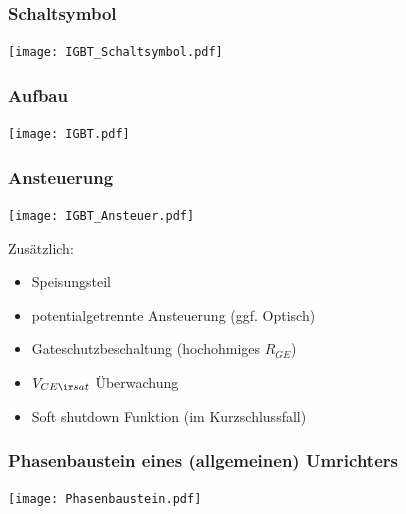 \documentclass[german]{latex4ei_fs}
\begin{document}
\begin{sectionbox}

\subsubsection*{Schaltsymbol}
\begin{center}
\texttt{[image: IGBT\_Schaltsymbol.pdf]}

\end{center}
\end{sectionbox}
\begin{sectionbox}


\subsubsection*{Aufbau}
\texttt{[image: IGBT.pdf]}
\end{sectionbox}
\begin{sectionbox}
\subsubsection*{Ansteuerung}
\texttt{[image: IGBT\_Ansteuer.pdf]}


Zusätzlich:
\begin{itemize}
	\item Speisungsteil
	\item potentialgetrennte Ansteuerung (ggf. Optisch)
	\item Gateschutzbeschaltung (hochohmiges $R_{GE}$)
	\item $V_{CE \ir sat}$ Überwachung
	\item Soft shutdown Funktion (im Kurzschlussfall)
\end{itemize}
\end{sectionbox}

\begin{sectionbox}
\subsubsection*{Phasenbaustein eines (allgemeinen) Umrichters}
\texttt{[image: Phasenbaustein.pdf]}

\end{sectionbox}
\end{document}
